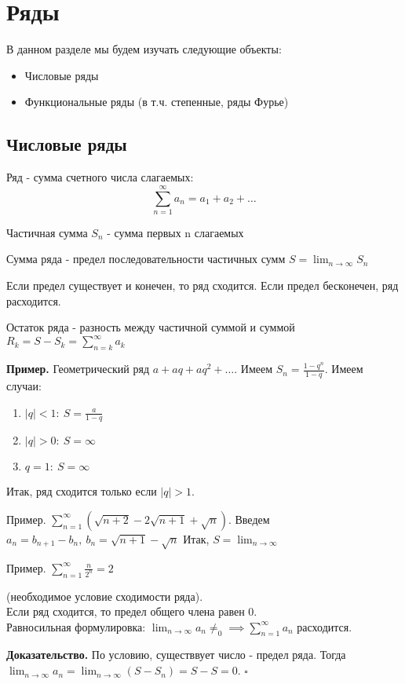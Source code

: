 \chapter{Ряды}
В данном разделе мы будем изучать следующие объекты:
\begin{itemize}
    \item Числовые ряды
    \item Функциональные ряды (в т.ч. степенные, ряды Фурье)
\end{itemize}

\section{Числовые ряды}
\begin{defin}
Ряд - сумма счетного числа слагаемых: $$\sum_{n=1}^{\infty} a_n =a_1+a_2+
\ldots$$
\end{defin}
\begin{defin}
Частичная сумма $S_n$ - сумма первых n слагаемых
\end{defin}
\begin{defin}
Сумма ряда - предел последовательности частичных сумм $S=\lim_{n \to \infty} 
S_n$
\end{defin}
Если предел существует и конечен, то ряд сходится. Если предел бесконечен, ряд 
расходится.
\begin{defin}
Остаток ряда - разность между частичной суммой и суммой $R_k=S-S_k=
\sum_{n=k}^{\infty} a_k $
\end{defin}
\textbf{Пример.} Геометрический ряд $a+aq+aq^2+\ldots$. Имеем $S_n=\frac{1-q^n
}{1-q}$. Имеем случаи:
\begin{enumerate}
    \item $|q|<1:~S=\frac{a}{1-q}$ 
    \item $|q|>0:~S=\infty$
    \item $q=1:~S=\infty$
\end{enumerate}
Итак, ряд сходится только если $|q|>1$.

Пример. $\sum_{n=1}^{\infty} (\sqrt{n+2} -2\sqrt{n+1} +\sqrt{n} )$.
Введем $a_n=b_{n+1}-b_n,~b_n=\sqrt{n+1}-\sqrt{n}$ 
Итак, $S=\lim_{n \to \infty} $

Пример. $\sum_{n=1}^{\infty} \frac{n}{2^n}=2$
\begin{theor}
    (необходимое условие сходимости ряда). \\ Если ряд сходится, то предел
    общего члена равен 0.\\
    Равносильная формулировка: $\lim_{n \to \infty}a_n\ne_0\implies \sum_{n=1}^{\infty} a_n $ расходится.
\end{theor}
\textbf{Доказательство.} По условию, существвует число - предел ряда.
Тогда $\lim_{n \to \infty}a_n=\lim_{n \to \infty}(S-S_n)=S-S=0$.
$\square$ 


